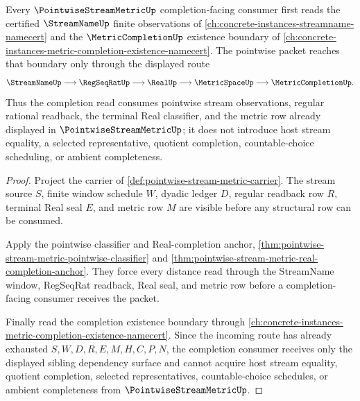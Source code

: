 \begin{theorem}
\label{thm:pointwise-stream-metric-completion-sibling-route}
Every $\PointwiseStreamMetricUp$ completion-facing consumer first reads the certified $\StreamNameUp$ finite observations of \autoref{ch:concrete-instances-streamname-namecert} and the $\MetricCompletionUp$ existence boundary of \autoref{ch:concrete-instances-metric-completion-existence-namecert}. The pointwise packet reaches that boundary only through the displayed route
$$
\StreamNameUp \longrightarrow \RegSeqRatUp \longrightarrow \RealUp \longrightarrow \MetricSpaceUp \longrightarrow \MetricCompletionUp .
$$
Thus the completion read consumes pointwise stream observations, regular rational readback, the terminal Real classifier, and the metric row already displayed in $\PointwiseStreamMetricUp$; it does not introduce host stream equality, a selected representative, quotient completion, countable-choice scheduling, or ambient completeness.
\end{theorem}
\begin{proof}
Project the carrier of \autoref{def:pointwise-stream-metric-carrier}. The stream source $S$, finite window schedule $W$, dyadic ledger $D$, regular readback row $R$, terminal Real seal $E$, and metric row $M$ are visible before any structural row can be consumed.

Apply the pointwise classifier and Real-completion anchor, \autoref{thm:pointwise-stream-metric-pointwise-classifier} and \autoref{thm:pointwise-stream-metric-real-completion-anchor}. They force every distance read through the StreamName window, RegSeqRat readback, Real seal, and metric row before a completion-facing consumer receives the packet.

Finally read the completion existence boundary through \autoref{ch:concrete-instances-metric-completion-existence-namecert}. Since the incoming route has already exhausted $S,W,D,R,E,M,H,C,P,N$, the completion consumer receives only the displayed sibling dependency surface and cannot acquire host stream equality, quotient completion, selected representatives, countable-choice schedules, or ambient completeness from $\PointwiseStreamMetricUp$.
\end{proof}
